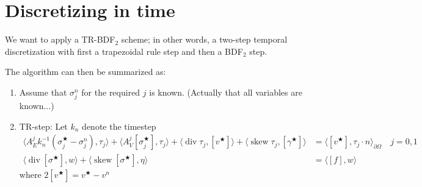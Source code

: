 \documentclass{amsart}
\DeclareMathOperator{\Div}{div}
\DeclareMathOperator{\Skew}{skew}
\newcommand{\avg}[1]{[#1]}
\newcommand{\inner}[2]{\langle #1, #2 \rangle}
\begin{document}
\section{Discretizing in time}


We want to apply a TR-BDF$_2$ scheme; in other words, a two-step
temporal discretization with first a trapezoidal rule step and then a
BDF$_2$ step.

The algorithm can then be summarized as:
\begin{enumerate}
\item
  Assume that $\sigma_j^{n}$ for the required $j$ is known. (Actually that all variables are known...)
\item
  TR-step: Let $k_n$ denote the timestep
  \begin{align}
    \inner{A_E^{j} k_n^{-1} (\sigma_j^{\bigstar} - \sigma_j^n)}{\tau_j}
    + \inner{A_{V}^{j} \avg{\sigma_j^{\bigstar} }}{\tau_j}
    + \inner{\Div \tau_j}{\avg{v^{\bigstar}} }
    + \inner{\Skew \tau_j}{\avg{\gamma^{\bigstar}}}
    &= \inner{\avg{v^{\bigstar}}}{\tau_j \cdot n}_{\partial \Omega}
    \quad j = 0, 1 \\
    \inner{\Div \avg{\sigma^{\bigstar}}}{w} + \inner{\Skew \avg{\sigma^{\bigstar}}}{\eta} & = \inner{\avg{f}}{w}
  \end{align}
  where $2 \avg{v^{\bigstar}} = v^{\bigstar} - v^{n}$
\end{enumerate}
\end{document}
